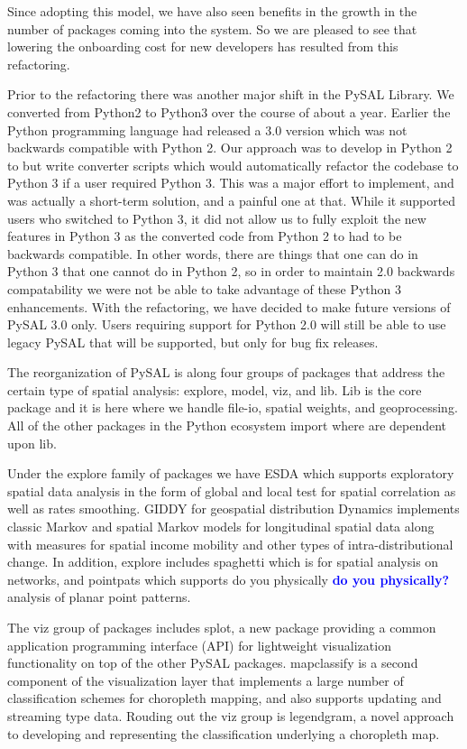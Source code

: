 \documentclass[11pt]{article}
\newcommand\ek[1]{\textcolor{blue}{\textbf{#1}}}
\begin{document}
Since adopting this model, we have also seen benefits in the growth in the number
of packages coming into the system. So we are pleased to see that lowering the
onboarding cost for new developers has resulted from this refactoring.


Prior to the refactoring there was another major shift in the PySAL Library. We
converted from Python2 to Python3 over the course of about a year. Earlier the
Python programming language had released a 3.0 version which was not backwards
compatible with Python 2. Our approach was to develop in Python 2 to but write
converter scripts which would automatically refactor the codebase to Python 3
if a user required Python 3. This was a major effort to implement, and was
actually a short-term solution, and a painful one at that. While it supported
users who switched to Python 3, it did not allow us to fully exploit the new
features in Python 3 as the converted code from Python 2 to had to be backwards
compatible. In other words, there are things that one can do in Python 3 that
one cannot do in Python 2, so in order to maintain 2.0 backwards compatability
we were not be able to take advantage of these Python 3 enhancements. With the
refactoring, we have decided to make future versions of PySAL 3.0 only. Users
requiring support for Python 2.0 will still be able to use legacy PySAL that
will be supported, but only for bug fix releases.


The reorganization of PySAL is along four groups of packages that address the
certain type of spatial analysis: explore, model, viz, and lib. Lib is the core
package and it is here where we handle file-io, spatial weights, and
geoprocessing. All of the other packages in the Python ecosystem import where
are dependent upon lib.

Under the explore family of packages we have ESDA which supports exploratory
spatial data analysis in the form of global and local test for spatial
correlation as well as rates smoothing. GIDDY for geospatial distribution
Dynamics implements classic Markov and spatial Markov models for longitudinal
spatial data along with measures for spatial income mobility and other types of
intra-distributional change. In addition, explore includes spaghetti which is
for spatial analysis on networks, and pointpats which supports do you
physically \ek{do you physically?} analysis of planar point patterns.

The viz group of packages includes splot, a new package providing a
common application programming interface (API) for lightweight visualization
functionality on top of the other PySAL packages. mapclassify is a second
component of the visualization layer that implements a large number of
classification schemes for choropleth mapping, and also supports updating and
streaming type data. Rouding out the viz group is legendgram, a novel approach
to developing and representing the classification underlying a choropleth
map.
\end{document}
